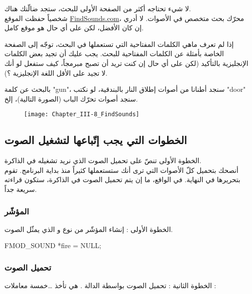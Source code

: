 لا شيء تحتاجه أكثر من الصفحة الأولى للبحث، ستجد ضالّتك هناك.\\
شخصياً حفظت الموقع 
\href{http://www.findsounds.com/}{\textenglish{FindSounds.com}}،
محرّك بحث متخصص في الأصوات. لا أدري إن كان الأفضل، لكن على أي حال هو موقع كامل.

\begin{information}
إذا لم تعرف  ماهي الكلمات المفتاحية التي تستعملها في البحث، توجّه إلى الصفحة الخاصة بأمثلة عن الكلمات المفتاحية للبحث.
يجب عليك أن تجيد بعض الكلمات الإنجليزية بالتأكيد (لكن على أي حال إن كنت تريد أن تصبح مبرمجاً، كيف ستفعل لو أنك لا تجيد على الأقل اللغة الإنجليزية ؟).
\end{information}

بالبحث عن كلمة
"\textenglish{gun}"،
سنجد أطنانا من أصوات إطلاق النار بالبندقية، لو نكتب
"\textenglish{door}"
سنجد أصوات تحرّك الباب (الصورة التالية)، إلخ.

\begin{figure}[H]
	\centering
	\texttt{[image: Chapter\_III-8\_FindSounds]}
\end{figure}

\subsection{الخطوات التي يجب إتّباعها لتشغيل الصوت}

 الخطوة الأولى تنصّ على تحميل الصوت الذي نريد تشغيله في الذاكرة.\\
أنصحك بتحميل كلّ الأصوات التي ترى أنك ستستعملها كثيراً منذ بداية البرنامج. تقوم بتحريرها في النهاية. في الواقع، ما إن يتم تحميل الصوت في الذاكرة، ستكون قراءته سريعة جداً.

\subsubsection{المؤشّر}

الخطوة الأولى : إنشاء المؤشّر من نوع
و الذي يمثّل الصوت.

\begin{Csource}
FMOD_SOUND *fire = NULL;
\end{Csource}

\subsubsection{تحميل الصوت}

الخطوة الثانية : تحميل الصوت بواسطة الدالة
.
هي تأخذ \dots خمسة معاملات :

